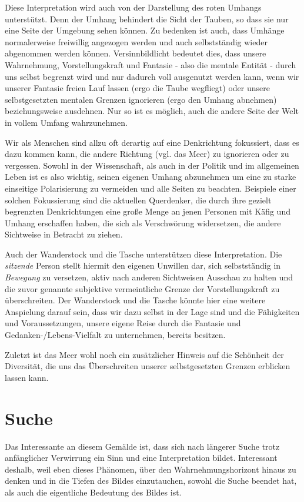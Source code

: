 \documentclass[a4paper, 12pt]{article}
\begin{document}
Diese Interpretation wird auch von der Darstellung des roten Umhangs unterstützt. Denn der Umhang behindert die Sicht der Tauben, so dass sie nur eine Seite der Umgebung sehen können. Zu bedenken ist auch, dass Umhänge normalerweise freiwillig angezogen werden und auch selbstständig wieder abgenommen werden können. Versinnbildlicht bedeutet dies, dass unsere Wahrnehmung, Vorstellungskraft und Fantasie - also die mentale Entität - durch uns selbst begrenzt wird und nur dadurch voll ausgenutzt werden kann, wenn wir unserer Fantasie freien Lauf lassen (ergo die Taube wegfliegt) oder unsere selbstgesetzten mentalen Grenzen ignorieren (ergo den Umhang abnehmen) beziehungsweise ausdehnen. Nur so ist es möglich, auch die andere Seite der Welt in vollem Umfang wahrzunehmen.

Wir als Menschen sind allzu oft derartig auf eine Denkrichtung fokussiert, dass es dazu kommen kann, die andere Richtung (vgl. das Meer) zu ignorieren oder zu vergessen. Sowohl in der Wissenschaft, als auch in der Politik und im allgemeinen Leben ist es also wichtig, seinen eigenen Umhang abzunehmen um eine zu starke einseitige Polarisierung zu vermeiden und alle Seiten zu beachten. Beispiele einer solchen Fokussierung sind die aktuellen Querdenker, die durch ihre gezielt begrenzten Denkrichtungen eine große Menge an jenen Personen mit Käfig und Umhang erschaffen haben, die sich als Verschwörung widersetzen, die andere Sichtweise in Betracht zu ziehen.

Auch der Wanderstock und die Tasche unterstützen diese Interpretation. Die \textit{sitzende} Person stellt hiermit den eigenen Unwillen dar, sich selbstständig in \textit{Bewegung} zu versetzen, aktiv nach anderen Sichtweisen Ausschau zu halten und die zuvor genannte subjektive vermeintliche Grenze der Vorstellungskraft zu überschreiten. Der Wanderstock und die Tasche könnte hier eine weitere Anspielung darauf sein, dass wir dazu selbst in der Lage sind und die Fähigkeiten und Voraussetzungen, unsere eigene Reise durch die Fantasie und Gedanken-/Lebens-Vielfalt zu unternehmen, bereits besitzen.

Zuletzt ist das Meer wohl noch ein zusätzlicher Hinweis auf die Schönheit der Diversität, die uns das Überschreiten unserer selbstgesetzten Grenzen erblicken lassen kann.

\section{Suche}
Das Interessante an diesem Gemälde ist, dass sich nach längerer Suche trotz anfänglicher Verwirrung ein Sinn und eine Interpretation bildet. Interessant deshalb, weil eben dieses Phänomen, über den Wahrnehmungshorizont hinaus zu denken und in die Tiefen des Bildes einzutauchen, sowohl die Suche beendet hat, als auch die eigentliche Bedeutung des Bildes ist.
\end{document}
